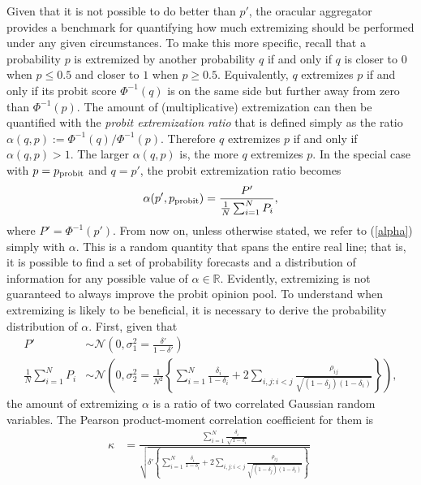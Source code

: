 \documentclass[11pt]{article}
\theoremstyle{definition}
\theoremstyle{definition}
\def\probit{p_{\rm probit}}
\begin{document}
Given that it is not
possible to do better than $p'$, the oracular aggregator provides a
benchmark for quantifying how much extremizing should be performed
under any given circumstances. To make this more specific, recall that a
probability $p$ is extremized by another probability $q$ if and only
if $q$ is closer to $0$ when $p \leq 0.5$ and closer to $1$ when $p
\geq 0.5$. Equivalently, $q$ extremizes $p$ if and only if its probit score $\Phi^{-1}(q)$ is on the same side but further away from zero than $\Phi^{-1}(p)$. The amount of (multiplicative) extremization can then be quantified with the {\em probit extremization ratio} that is defined simply as the ratio
 $\alpha(q,p) := \Phi^{-1}(q) / \Phi^{-1} (p)$. Therefore $q$
extremizes $p$ if and only if $\alpha(q,p) > 1$. The larger $\alpha(q,p)$ is, the more $q$ extremizes $p$. In the special case with $p =
\probit$ and $q = p'$, the probit extremization ratio becomes
\begin{align}
\alpha(p', \probit)  = \frac{P'}{\frac{1}{N}\sum_{i=1}^N P_{i}}, \label{alpha}
\end{align}
where $P' = \Phi^{-1}(p')$. From now on, unless otherwise stated, we refer to (\ref{alpha}) simply with
$\alpha$. This is a random quantity that spans the entire real line;
that is, it is possible to find a set of probability forecasts and a
distribution of information for any possible value of $\alpha \in
\mathbb{R}$.  Evidently, extremizing is not guaranteed to always
improve the probit opinion pool.  To understand when extremizing is
likely to be beneficial, it is necessary to derive the probability
distribution of $\alpha$.  First, given that
\begin{align*}
P' &\sim \mathcal{N}\left(0, \sigma^2_{1} = 
  \frac{\delta'}{1-\delta'} \right)\\ \frac{1}{N}\sum_{i=1}^N P_{i} 
&\sim \mathcal{N}\left(0, \sigma^2_{2} =\frac{1}{N^2} 
  \left\{ \sum_{i=1}^N \frac{\delta_i}{1-\delta_i} 
  + 2 \sum_{i,j: i<j} \frac{\rho_{ij}}{\sqrt{(1-\delta_j)(1-\delta_i)}}
  \right\} \right),
\end{align*}
the amount of extremizing $\alpha$ is a ratio of two correlated
Gaussian random variables.  The Pearson product-moment correlation
coefficient for them is
\begin{align*}
\kappa  &= 
  \frac{ \sum_{i=1}^N \frac{\delta_i}{\sqrt{1-\delta_i}}}
  {\sqrt{\delta'  \left\{ \sum_{i=1}^N \frac{\delta_i}{1-\delta_i} + 2 
  \sum_{i,j: i<j} \frac{\rho_{ij}}{\sqrt{(1-\delta_j)(1-\delta_i)}}\right\}}}
  \; 
\end{align*}
\end{document}
